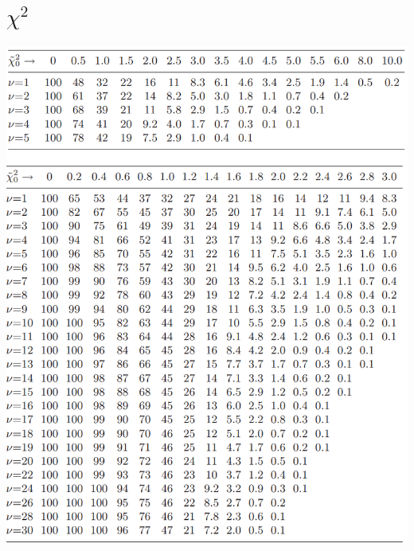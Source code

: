 \documentclass[11pt]{article}
\begin{document}
    \section{$ \chi^2 $}
    \begin{minipage}{.99\textwidth}
        \centering
        \includegraphics[width = .99\textwidth]{img/chi_table}
    \end{minipage}

    
    
\end{document}

